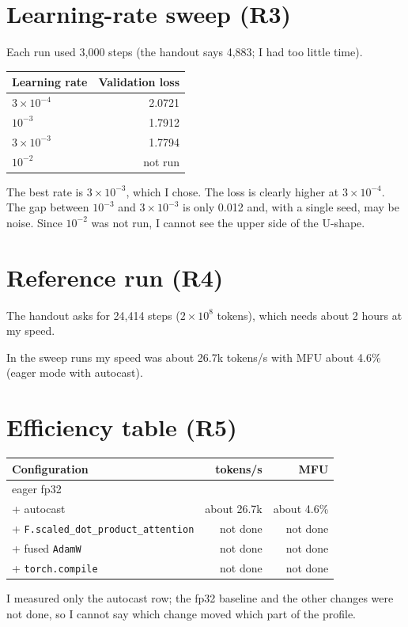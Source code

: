 \documentclass[11pt,a4paper]{article}
\begin{document}
\section{Learning-rate sweep (R3)}
Each run used 3,000 steps (the handout says 4,883; I had too little time).
\begin{table}[h]\centering
\begin{tabular}{@{}lr@{}}\toprule
Learning rate & Validation loss \\\midrule
$3\times10^{-4}$ & 2.0721 \\
$10^{-3}$ & 1.7912 \\
$3\times10^{-3}$ & 1.7794 \\
$10^{-2}$ & not run \\\bottomrule
\end{tabular}\end{table}
The best rate is $3\times10^{-3}$, which I chose. The loss is clearly higher at $3\times10^{-4}$. The gap between $10^{-3}$ and $3\times10^{-3}$ is only 0.012 and, with a single seed, may be noise. Since $10^{-2}$ was not run, I cannot see the upper side of the U-shape.

\section{Reference run (R4)}

The handout asks for 24,414 steps ($2\times10^{8}$ tokens), which needs about 2 hours at my speed.

In the sweep runs my speed was about 26.7k tokens/s with MFU about 4.6\% (eager mode with autocast).

\section{Efficiency table (R5)}
\begin{table}[h]\centering
\begin{tabular}{@{}lrr@{}}\toprule
Configuration & tokens/s & MFU \\\midrule
eager fp32 & & \\
+ autocast & about 26.7k & about 4.6\% \\
+ \texttt{F.scaled\_dot\_product\_attention} & not done & not done \\
+ fused \texttt{AdamW} & not done & not done \\
+ \texttt{torch.compile} & not done & not done \\\bottomrule
\end{tabular}\end{table}
I measured only the autocast row; the fp32 baseline and the other changes were not done, so I cannot say which change moved which part of the profile.
\end{document}

